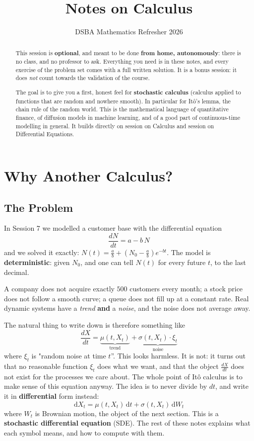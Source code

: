 \documentclass[]{article}
\title{Notes on \Ito{} Calculus}
\author{DSBA Mathematics Refresher 2026}
\date{}
\newcommand{\Ito}{It\^{o}}
\newcommand{\dd}{\mathrm{d}}
\begin{document}
	\maketitle

	\begin{abstract}
		This session is \textbf{optional}, and meant to be done \textbf{from home, autonomously}: there is no class, and no professor to ask.
		Everything you need is in these notes, and every exercise of the problem set comes with a full written solution.
		It is a bonus session: it does \textit{not} count towards the validation of the course.

		The goal is to give you a first, honest feel for \textbf{stochastic calculus} (calculus applied to functions that are random and nowhere smooth).
		In particular for \Ito's lemma, the chain rule of the random world.
		This is the mathematical language of quantitative finance, of diffusion models in machine learning, and of a good part of continuous-time modelling in general.
		It builds directly on session on Calculus and session on Differential Equations.

	\end{abstract}

	\tableofcontents

	\section{Why Another Calculus?}

	\subsection{The Problem}

	In Session 7 we modelled a customer base with the differential equation
	$$
	\frac{dN}{dt} = a - b\,N
	$$
	and we solved it exactly: $N(t) = \frac{a}{b} + \left(N_0 - \frac{a}{b}\right)e^{-bt}$.
	The model is \textbf{deterministic}: given $N_0$, and one can tell $N(t)$ for every future $t$, to the last decimal.

	A company does not acquire exactly $500$ customers every month; a stock price does not follow a smooth curve; a queue does not fill up at a constant rate.
	Real dynamic systems have a \textit{trend} \textbf{and} a \textit{noise}, and the noise does not average away.
	
	The natural thing to write down is therefore something like
	$$
	\frac{dX}{dt} = \underbrace{\mu(t, X_t)}_{\text{trend}} + \underbrace{\sigma(t, X_t) \cdot \xi_t}_{\text{noise}}
	$$
	where $\xi_t$ is "random noise at time $t$''.
	This looks harmless. It is not: it turns out that no reasonable function $\xi_t$ does what we want, and that the object $\frac{dX}{dt}$ does not exist for the processes we care about.
	The whole point of \Ito{} calculus is to make sense of this equation anyway.
	The idea is to never divide by $dt$, and write it in \textbf{differential} form instead:
	$$
	\boxed{\;\dd X_t = \mu(t, X_t)\, \dd t + \sigma(t, X_t)\, \dd W_t\;}
	$$
	where $W_t$ is Brownian motion, the object of the next section.
	This is a \textbf{stochastic differential equation} (SDE).
	The rest of these notes explains what each symbol means, and how to compute with them.
\end{document}
